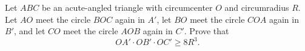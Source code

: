 Let $ABC$ be an acute-angled triangle with circumcenter $O$ and circumradius $R$. Let $AO$ meet the circle $BOC$ again in $A'$, let $BO$ meet the circle $COA$ again in $B'$, and let $CO$ meet the circle $AOB$ again in $C'$. Prove that
\[ OA' \cdot OB' \cdot OC' \geq 8R^3. \]

